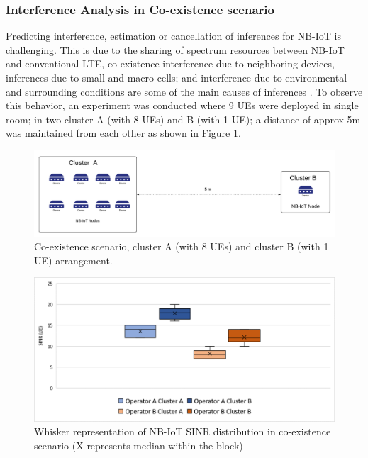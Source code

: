 \documentclass[12pt]{article}
\begin{document}
\newpage \subsubsection{Interference Analysis in Co-existence scenario} \label{interferenceExp}
Predicting interference, estimation or cancellation of inferences for NB-IoT is challenging. This is due to the sharing of spectrum resources between NB-IoT and conventional LTE, co-existence interference due to neighboring devices, inferences due to small and macro cells; and interference due to environmental and surrounding conditions are some of the main causes of inferences \cite{mwakwata2019narrowband}. To observe this behavior, an experiment was conducted where 9 UEs were deployed in single room; in two cluster A (with 8 UEs) and B (with 1 UE); a distance of approx 5m was maintained from each other as shown in Figure \ref{fig:Example of device deployment in heterogeneous case}.\par

\begin{figure}[h!]
    \centering
    \includegraphics[width=0.8\linewidth]{Images/hetrogenousCase.pdf}
    \caption{Co-existence scenario, cluster A (with 8 UEs) and cluster B (with 1 UE) arrangement.}
    \label{fig:Example of device deployment in heterogeneous case}
\end{figure}
\begin{figure}[h]
    \centering
    \includegraphics[width=.8\linewidth]{Images/SINRBoxplot.pdf}
    \caption{Whisker representation of NB-IoT SINR distribution in co-existence scenario (X represents median within the block)}
    \label{fig:SINR distribution}
\end{figure}
\end{document}
